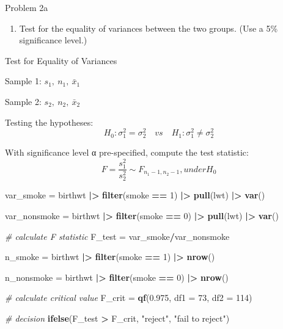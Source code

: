 \documentclass[
]{article}
\newenvironment{Shaded}{\begin{snugshade}}{\end{snugshade}}
\newcommand{\AttributeTok}[1]{\textcolor[rgb]{0.13,0.29,0.53}{#1}}
\newcommand{\CommentTok}[1]{\textcolor[rgb]{0.56,0.35,0.01}{\textit{#1}}}
\newcommand{\DecValTok}[1]{\textcolor[rgb]{0.00,0.00,0.81}{#1}}
\newcommand{\FloatTok}[1]{\textcolor[rgb]{0.00,0.00,0.81}{#1}}
\newcommand{\FunctionTok}[1]{\textcolor[rgb]{0.13,0.29,0.53}{\textbf{#1}}}
\newcommand{\NormalTok}[1]{#1}
\newcommand{\OtherTok}[1]{\textcolor[rgb]{0.56,0.35,0.01}{#1}}
\newcommand{\SpecialCharTok}[1]{\textcolor[rgb]{0.81,0.36,0.00}{\textbf{#1}}}
\newcommand{\StringTok}[1]{\textcolor[rgb]{0.31,0.60,0.02}{#1}}
\providecommand{\tightlist}{%
  \setlength{\itemsep}{0pt}\setlength{\parskip}{0pt}}
\begin{document}
Problem 2a

\begin{enumerate}
\def\labelenumi{\alph{enumi})}
\tightlist
\item
  Test for the equality of variances between the two groups. (Use a 5\%
  significance level.)
\end{enumerate}

Test for Equality of Variances

Sample 1: \(s_1, ~ n_1, ~ \bar{x}_1\)

Sample 2: \(s_2, ~ n_2, ~ \bar{x}_2\)

Testing the hypotheses:
\[  H_0 : \sigma_1^2 = \sigma_2^2 \quad vs \quad H_1 : \sigma_1^2 \ne \sigma_2^2\]

With significance level α pre-specified, compute the test statistic:
\[ F = {\frac{s_1^2}{s_2^2}} \sim F_{n_1-1, n_2-1},under H_0\]

\begin{Shaded}
\begin{Highlighting}[]
\NormalTok{var\_smoke }\OtherTok{=} 
\NormalTok{  birthwt }\SpecialCharTok{|\textgreater{}} 
  \FunctionTok{filter}\NormalTok{(smoke }\SpecialCharTok{==} \DecValTok{1}\NormalTok{) }\SpecialCharTok{|\textgreater{}} 
  \FunctionTok{pull}\NormalTok{(lwt) }\SpecialCharTok{|\textgreater{}}
  \FunctionTok{var}\NormalTok{()}

\NormalTok{var\_nonsmoke }\OtherTok{=} 
\NormalTok{  birthwt }\SpecialCharTok{|\textgreater{}} 
  \FunctionTok{filter}\NormalTok{(smoke }\SpecialCharTok{==} \DecValTok{0}\NormalTok{) }\SpecialCharTok{|\textgreater{}} 
  \FunctionTok{pull}\NormalTok{(lwt) }\SpecialCharTok{|\textgreater{}}
  \FunctionTok{var}\NormalTok{()}

\CommentTok{\# calculate F statistic}
\NormalTok{F\_test }\OtherTok{=}\NormalTok{ var\_smoke}\SpecialCharTok{/}\NormalTok{var\_nonsmoke}

\NormalTok{n\_smoke }\OtherTok{=} 
\NormalTok{  birthwt }\SpecialCharTok{|\textgreater{}} 
  \FunctionTok{filter}\NormalTok{(smoke }\SpecialCharTok{==} \DecValTok{1}\NormalTok{) }\SpecialCharTok{|\textgreater{}} 
  \FunctionTok{nrow}\NormalTok{()}
  
\NormalTok{n\_nonsmoke }\OtherTok{=} 
\NormalTok{  birthwt }\SpecialCharTok{|\textgreater{}} 
  \FunctionTok{filter}\NormalTok{(smoke }\SpecialCharTok{==} \DecValTok{0}\NormalTok{) }\SpecialCharTok{|\textgreater{}} 
  \FunctionTok{nrow}\NormalTok{()}

\CommentTok{\# calculate critical value  }
\NormalTok{F\_crit }\OtherTok{=} \FunctionTok{qf}\NormalTok{(}\FloatTok{0.975}\NormalTok{, }\AttributeTok{df1 =} \DecValTok{73}\NormalTok{, }\AttributeTok{df2 =} \DecValTok{114}\NormalTok{)}

\CommentTok{\# decision}
\FunctionTok{ifelse}\NormalTok{(F\_test }\SpecialCharTok{\textgreater{}}\NormalTok{ F\_crit, }\StringTok{"reject"}\NormalTok{, }\StringTok{"fail to reject"}\NormalTok{)}
\end{Highlighting}
\end{Shaded}
\end{document}
